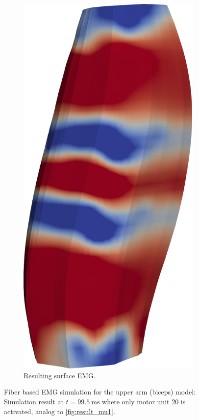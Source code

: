 \begin{figure}[H]
\begin{subfigure}[t]{0.25\textwidth}
    \includegraphics[width=\textwidth]{images/results/application/mu20b.png}%
    \caption{Resulting surface EMG.}%
    \label{fig:mu20b}%
  \end{subfigure}   
  \caption{Fiber based EMG simulation for the upper arm (biceps) model: Simulation result at $t=\SI{99.5}{\milli\second}$ where only motor unit 20 is activated, analog to \cref{fig:result_mu1}.}%
  \label{fig:result_mu20}%
\end{figure}%

